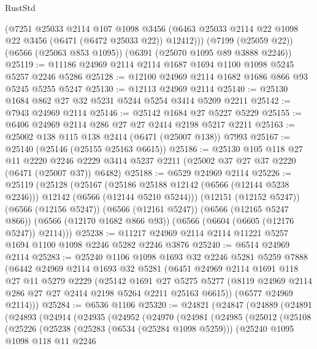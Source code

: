 \begin{lexlean}{RustStd}
\begin{coremodule}
      (@7251
        @25033
        @2114
        @107
        @1098
        @3456
        (@6463 @25033 @2114 @22 @1098 @22 @3456 (@6471 (@6472 @25033 @22)) @12412)))
    (@7199 (@25059 @22))
    (@6566 (@25063 @853 @1095))
    (@6391 (@25070 @1095 @89 @3888 @2246))
@25119 := @11186 @24969 @2114 @2114 @1687 @1694 @1100 @1098 @5245 @5257 @2246 @5286
@25128 := @12100 @24969 @2114 @1682 @1686 @866 @93 @5245 @5255 @5247
@25130 := @12113 @24969 @2114
@25140 := @25130 @1684 @862 @27 @32 @5231 @5244 @5254 @3414 @5209 @2211
@25142 := @7943 @24969 @2114
@25146 := @25142 @1684 @27 @5227 @5229
@25155 := @6406 @24969 @2114 @286 @27 @27 @2414 @2198 @5217 @2211
@25163 := @25002 @138 @115 @138 @2414 (@6471 (@25007 @138)) @7993
@25167 := @25140 (@25146 (@25155 @25163 @6615))
@25186 := @25130
    @105
    @118
    @27
    @11
    @2220
    @2246
    @2229
    @3414
    @5237
    @2211
    (@25002 @37 @27 @37 @2220 (@6471 (@25007 @37)) @6482)
@25188 := @6529 @24969 @2114
@25226 := @25119
    (@25128
      (@25167
        (@25186 @25188 @12142 (@6566 (@12144 @5238 @2246)))
        @12142
        (@6566 (@12144 @5210 @5244)))
      (@12151 (@12152 @5247))
      (@6566 (@12156 @5247))
      (@6566 (@12161 @5247))
      (@6566 (@12165 @5247 @866))
      (@6566 (@12170 @1682 @866 @93))
      (@6566 (@6604 (@6605 (@12176 @5247)) @2114)))
@25238 := @11217 @24969 @2114 @2114 @11221 @5257 @1694 @1100 @1098 @2246 @5282 @2246 @3876
@25240 := @6514 @24969 @2114
@25283 := @25240
    @1106
    @1098
    @1693
    @32
    @2246
    @5281
    @5259
    @7888
    (@6442
      @24969
      @2114
      @1693
      @32
      @5281
      (@6451
        @24969
        @2114
        @1691
        @118
        @27
        @11
        @5279
        @2229
        (@25142
          @1691
          @27
          @5275
          @5277
          (@8119 @24969 @2114 @286 @27 @27 @2414 @2198 @5264 @2211 @25163 @6615))
        (@6577 @24969 @2114)))
@25284 := @6536 @1106
@25320 := @24821
    (@24847
      (@24889
        (@24891
          (@24893
            (@24914
              (@24935
                (@24952
                  (@24970
                    (@24981
                      (@24985
                        (@25012
                          (@25108
                            (@25226
                              (@25238
                                (@25283 (@6534 (@25284 @1098 @5259)))
                                (@25240
                                  @1095
                                  @1098
                                  @118
                                  @11
                                  @2246

\end{coremodule}
\end{lexlean}
